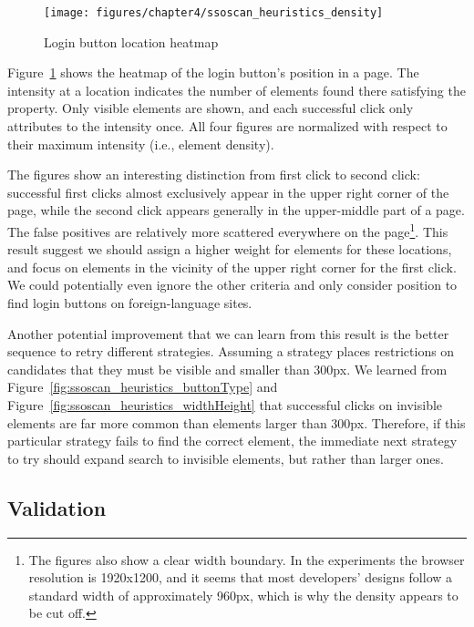 \begin{figure}[tb]
\centering
\texttt{[image: figures/chapter4/ssoscan\_heuristics\_density]}
\caption{Login button location heatmap}
\label{fig:ssoscan_heuristics_density}
\end{figure}

 Figure~\ref{fig:ssoscan_heuristics_density} shows the heatmap of the login button's position in a page.  The intensity at a location indicates the number of elements found there satisfying the property.  Only visible elements are shown, and each successful click only attributes to the intensity once.  All four figures are normalized with respect to their maximum intensity (i.e., element density).

The figures show an interesting distinction from first click to second click: successful first clicks almost exclusively appear in the upper right corner of the page, while the second click appears generally in the upper-middle part of a page.  The false positives are relatively more scattered everywhere on the page\footnote{The figures also show a clear width boundary.  In the experiments the browser resolution is 1920x1200, and it seems that most developers' designs follow a standard width of approximately 960px, which is why the density appears to be cut off.}.  This result suggest we should assign a higher weight for elements for these locations, and focus on elements in the vicinity of the upper right corner for the first click.  We could potentially even ignore the other criteria and only consider position to find login buttons on foreign-language sites.

Another potential improvement that we can learn from this result is the better sequence to retry different strategies.  Assuming a strategy places restrictions on candidates that they must be visible and smaller than 300px.  We learned from Figure~\ref{fig:ssoscan_heuristics_buttonType} and Figure~\ref{fig:ssoscan_heuristics_widthHeight} that successful clicks on invisible elements are far more common than elements larger than 300px.  Therefore, if this particular strategy fails to find the correct element, the immediate next strategy to try should expand search to invisible elements, but rather than larger ones.

\subsection{Validation}
\label{sec:ssoscan_heuristics_laterstudy}

